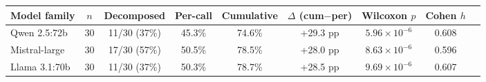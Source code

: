 \begin{tabular}{lcccccccc}
\toprule
\textbf{Model family} & \textbf{$n$} & \textbf{Decomposed} & \textbf{Per-call} & \textbf{Cumulative} & \textbf{$\Delta$ (cum$-$per)} & \textbf{Wilcoxon $p$} & \textbf{Cohen $h$} \\
\midrule
Qwen 2.5:72b & 30 & 11/30 (37\%) & 45.3\% & 74.6\% & +29.3 pp & $5.96\times10^{-6}$ & 0.608 \\
Mistral-large & 30 & 17/30 (57\%) & 50.5\% & 78.5\% & +28.0 pp & $8.63\times10^{-6}$ & 0.596 \\
Llama 3.1:70b & 30 & 11/30 (37\%) & 50.3\% & 78.7\% & +28.5 pp & $9.69\times10^{-6}$ & 0.607 \\
\bottomrule
\end{tabular}